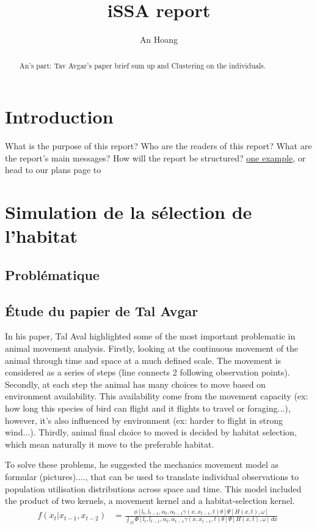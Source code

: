 \documentclass{article}
\title{iSSA report}
\author{An Hoang}
\begin{document}
\maketitle

\begin{abstract}
An's part:  Tav Avgar's paper brief sum up and Clustering on the individuals.
\end{abstract}

\section{Introduction}
What is the purpose of this report?
Who are the readers of this report?
What are the report’s main messages?
How will the report be structured?
 \href{https://www.overleaf.com/learn}{one example}, or head to our plans page to 
 
\section{Simulation de la sélection de l'habitat}

\subsection{Problématique}



\subsection{Étude du papier de Tal Avgar}

In his paper, Tal Aval highlighted some of the most important problematic in animal movement analysis. Firstly, looking at the continuous movement of the animal through time and space at a much defined scale. The movement is considered as a series of steps (line connects 2 following observation points). Secondly, at each step the animal has many choices to move based on environment availability. This availability come from the movement capacity (ex: how long this species of bird can flight and it flights to travel or foraging...), however, it's also influenced by environment (ex: harder to flight in strong wind...). Thirdly, animal final choice to moved is decided by habitat selection, which mean naturally it move to the preferable habitat. 

To solve these problems, he suggested the mechanics movement model as formular (pictures)...., that can be used to translate individual observations to population utilisation distributions across space and time. This model included the product of two kernels, a movement kernel and a habitat-selection kernel.
\begin{align*}
f(x_t|x_{t-1},x_{t-2}) &= \frac{\phi[l_t,l_{t-1},\alpha_t,\alpha_{t-1}\gamma(x,x_{t-1},t)\theta]\Psi[H(x,t),\omega]}{\int_\Omega \Phi[l_t,l_{t-1},\alpha_t,\alpha_{t-1}\gamma(x,x_{t-1},t)\theta]\Psi[H(x,t),\omega]\,dx}\
\end{align*}
\end{document}
